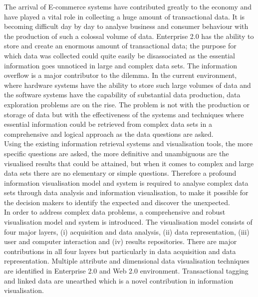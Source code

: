 \documentclass[12pt, oneside]{Thesis} %
\begin{document}





\abstract{} %
The arrival of E-commerce systems have contributed greatly to the economy and have played a vital role in collecting a huge amount of transactional data. It is becoming difficult day by day to analyse business and consumer behaviour with the production of such a colossal volume of data. Enterprise 2.0 has the ability to store and create an enormous amount of transactional data; the purpose for which data was collected could quite easily be disassociated as the essential information goes unnoticed in large and complex data sets. The information overflow is a major contributor to the dilemma. In the current environment, where hardware systems have the ability to store such large volumes of data and the software systems have the capability of substantial data production, data exploration problems are on the rise. The problem is not with the production or storage of data but with the effectiveness of the systems and techniques where essential information could be retrieved from complex data sets in a comprehensive and logical approach as the data questions are asked.\\

Using the existing information retrieval systems and visualisation tools, the more specific questions are asked, the more definitive and unambiguous are the visualised results that could be attained, but when it comes to complex and large data sets there are no elementary or simple questions. Therefore a profound information visualisation model and system is required to analyse complex data sets through data analysis and information visualisation, to make it possible for the decision makers to identify the expected and discover the unexpected.\\

In order to address complex data problems, a comprehensive and robust visualisation model and system is introduced. The visualisation model consists of four major layers, (i) acquisition and data analysis, (ii) data representation, (iii) user and computer interaction and (iv) results repositories. There are major contributions in all four layers but particularly in data acquisition and data representation. Multiple attribute and dimensional data visualisation techniques are identified in Enterprise 2.0 and Web 2.0 environment. Transactional tagging and linked data are unearthed which is a novel contribution in information visualisation.  \\
\end{document}
